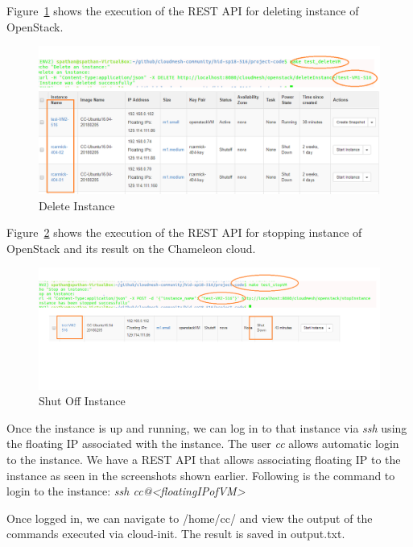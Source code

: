 Figure~\ref{fig:deleteVM} shows the execution of the REST API for deleting
instance of OpenStack.
\begin{figure}[!ht]
        \centering\includegraphics[width=\columnwidth]{images/deleteVM.png}
        \caption{Delete Instance}
        \label{fig:deleteVM}
\end{figure}

Figure~\ref{fig:stopVM} shows the execution of the REST API for stopping
instance of OpenStack and its result on the Chameleon cloud.

\begin{figure}[!ht]
        \centering\includegraphics[width=\columnwidth]{images/stopVM.png}
        \caption{Shut Off Instance}
        \label{fig:stopVM}
\end{figure}

Once the instance is up and running, we can log in to that instance via
\textit{ssh} using the floating IP associated with the instance. The user
\textit{cc} allows automatic login to the instance. We have a REST API that
allows associating floating IP to the instance as seen in the screenshots shown
earlier. Following is the command to login to the instance:
\textit{ssh cc@<floatingIPofVM>}

Once logged in, we can navigate to /home/cc/ and view the output of the 
commands executed via cloud-init. The result is saved in output.txt.

